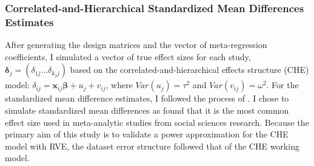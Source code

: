 
\subsubsection{Correlated-and-Hierarchical Standardized Mean Differences Estimates}

After generating the design matrices and the vector of meta-regression coefficients, I simulated a vector of true effect sizes for each study, $\mathbf{\delta}_j = (\delta_{1j} \dots \delta_{k_jj})$ based on the correlated-and-hierarchical effects structure (CHE) model: $ \delta_{ij} = \mathbf{x}_{ij}\boldsymbol{\beta} +  u_j + v_{ij}$,  where $Var(u_j) = \tau^2$ and $Var(v_{ij})= \omega^2$. For the standardized mean difference estimates, I followed the process of \textcite{pustejovsky2022, vembye2023}. I chose to simulate standardized mean differences as \textcite{tipton2019} found that it is the most common effect size used in meta-analytic studies from social sciences research. Because the primary aim of this study is to validate a power approximation for the CHE model with RVE, the dataset error structure followed that of the CHE working model. 


